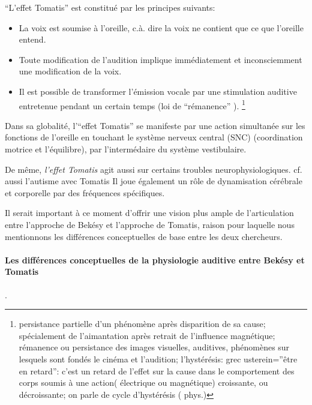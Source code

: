 ``L'effet Tomatis'' est constitué par les principes suivants:  
\begin{itemize}
	\item La voix est soumise à l'oreille, c.à. dire la voix ne contient que ce que l'oreille entend.
	\item Toute modification de l'audition implique immédiatement
          et inconsciemment une
          modification de la voix.
	\item Il est possible de transformer l'émission vocale par une stimulation 
auditive
		entretenue pendant un certain temps (loi de
                ``rémanence'' ). \footnote {persistance partielle d'un phénomène
                après disparition de sa cause; spécialement de
                l'aimantation après retrait de l'influence magnétique;
                rémanence ou persistance des images visuelles, auditives,
                phénomènes sur lesquels sont fondés le cinéma et
                l'audition; l'hystérésis: grec usterein=''être en
                retard'': c'est un retard de l'effet sur la cause dans
                le comportement des corps soumis à une action(
                électrique ou magnétique) croissante, ou décroissante;
                on parle de cycle d'hystérésis ( phys.)}
\end{itemize}

Dans sa globalité, l'``effet Tomatis'' se manifeste par une action
simultanée sur les fonctions de
l'oreille en touchant le système nerveux central (SNC) (coordination
                motrice et l'équilibre), par l'intermédaire du système
                vestibulaire.

                De même, \textit{l'effet Tomatis} agit aussi sur certains troubles
                neurophysiologiques. cf. aussi l'autisme avec Tomatis
                Il joue également un rôle de dynamisation cérébrale et corporelle
               par des fréquences spécifiques.





Il serait important à ce moment d'offrir une vision plus ample de
l'articulation entre l'approche de Bekésy et l'approche de Tomatis,
raison pour laquelle nous mentionnons les différences conceptuelles de
base entre les deux chercheurs.
\paragraph{Les différences conceptuelles de la physiologie auditive
  entre Bekésy et Tomatis}.



